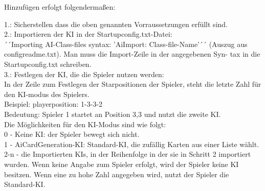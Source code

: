 \documentclass[12pt,a4paper,oneside]{book}
\theoremstyle{plain}
\numberwithin{equation}{chapter} \DeclareMathOperator{\Var}{Var}
\begin{document}
     Hinzufügen erfolgt folgendermaßen:
    \begin{itemize}
        1.: Sicherstellen dass die oben genannten Vorraussetzungen erfüllt sind. \\
        2.: Importieren der KI in der Startupconfig.txt-Datei: \\
        \hspace*{10mm}´´Importing AI-Class-files syntax: 'AiImport: Class-file-Name'´´ (Auszug
        \hspace*{10mm}aus configreadme.txt). Man muss die Import-Zeile in der angegebenen Syn-
        \hspace*{10mm}tax in die Startupconfig.txt schreiben. \\
        3.: Festlegen der KI, die die Spieler nutzen werden: \\
        \hspace*{10mm}In der Zeile zum Festlegen der Starpositionen der Spieler, steht die letzte
        \hspace*{10mm}Zahl für den KI-modus des Spielers. \\
        \hspace*{10mm}Beispiel: playerposition: 1-3-3-2 \\
        \hspace*{15mm}Bedeutung: Spieler 1 startet an Position 3,3 und nutzt die zweite KI. \\
        \hspace*{15mm}Die Möglichkeiten für den KI-Modus sind wie folgt: \\
        \hspace*{18mm}0 - Keine KI: der Spieler bewegt sich nicht. \\
        \hspace*{18mm}1 - AiCardGeneration-KI: Standard-KI, die zufällig Karten aus einer
        \hspace*{24mm}Liste wählt. \\
        \hspace*{18mm}2-n - die Importierten KIs, in der Reihenfolge in der sie in Schritt 2
        \hspace*{18mm}importiert wurden. Wenn keine Angabe zum Spieler erfolgt, wird der
        \hspace*{18mm}Spieler keine KI besitzen. Wenn eine zu hohe Zahl angegeben wird,
        \hspace*{18mm}nutzt der Spieler die Standard-KI.
    \end{itemize}
\end{document}
